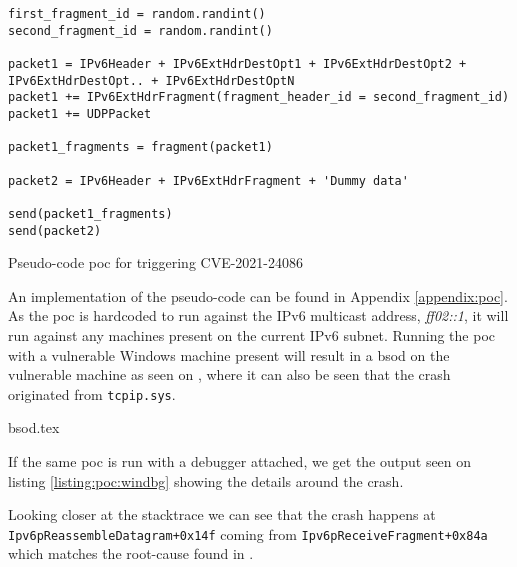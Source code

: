 \documentclass{report}
\begin{document}
\begin{listing}[H]
\begin{verbatim}
first_fragment_id = random.randint()
second_fragment_id = random.randint()

packet1 = IPv6Header + IPv6ExtHdrDestOpt1 + IPv6ExtHdrDestOpt2 + IPv6ExtHdrDestOpt.. + IPv6ExtHdrDestOptN
packet1 += IPv6ExtHdrFragment(fragment_header_id = second_fragment_id)
packet1 += UDPPacket

packet1_fragments = fragment(packet1)

packet2 = IPv6Header + IPv6ExtHdrFragment + 'Dummy data'

send(packet1_fragments)
send(packet2)
\end{verbatim}
\caption{Pseudo-code \gls{poc} for triggering CVE-2021-24086}
\label{listing:poc:pseudo}
\end{listing}

An implementation of the pseudo-code can be found in Appendix \ref{appendix:poc}. As the \gls{poc} is hardcoded to run against the IPv6 multicast address, \emph{ff02::1}, it will run against any machines present on the current IPv6 subnet. Running the \gls{poc} with a vulnerable Windows machine present will result in a \gls{bsod} on the vulnerable machine as seen on , where it can also be seen that the crash originated from \texttt{tcpip.sys}.

{bsod.tex}

If the same \gls{poc} is run with a debugger attached, we get the output seen on listing \ref{listing:poc:windbg} showing the details around the crash.


Looking closer at the stacktrace we can see that the crash happens at \texttt{Ipv6pReassembleDatagram+0x14f} coming from \texttt{Ipv6pReceiveFragment+0x84a} which matches the root-cause found in .
\end{document}
